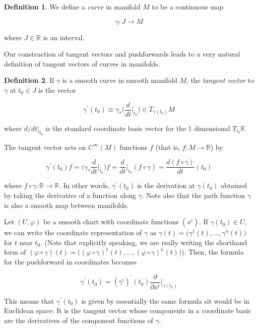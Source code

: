 \documentclass{article}
\theoremstyle{remark}
\theoremstyle{definition}
\newtheorem{definition}{Definition}[section]
\begin{document}
    \begin{definition}
      We define a \textit{curve} in manifold $M$ to be a continuous map 

        \[\gamma: J \longrightarrow M\]

      where $J \in \mathbb{R}$ is an interval. 
    \end{definition}

    Our construction of tangent vectors and pushforwards leads to a very natural definition of tangent vectors of curves in manifolds. 

    \begin{definition}
      If $\gamma$ is a smooth curve in smooth manifold $M$, the \textit{tangent vector} to $\gamma$ at $t_0 \in J$ is the vector 

        \[\gamma^\prime (t_0) \equiv \gamma_* \bigg( \frac{d}{dt} \bigg|_{t_0} \bigg) \in T_{\gamma(t_0)} M\]

      where $d/dt \big|_{t_0}$ is the standard coordinate basis vector for the 1 dimensional $T_{t_0} \mathbb{R}$. 
    \end{definition}

    The tangent vector acts on $C^\infty(M)$ functions $f$ (that is, $f: M \longrightarrow \mathbb{R}$) by

      \[\gamma^\prime (t_0) f = \bigg( \gamma_* \frac{d}{dt} \bigg|_{t_0} \bigg) f = \frac{d}{dt} \bigg|_{t_0} (f \circ \gamma) = \frac{d (f \circ \gamma)}{dt} (t_0)\]
    
    where $f \circ \gamma: \mathbb{R} \longrightarrow \mathbb{R}$. In other words, $\gamma^\prime (t_0)$ is the derivation at $\gamma(t_0)$ obtained by taking the derivative of a function along $\gamma$. Note also that the path function $\gamma$ is also a smooth map between manifolds. 

    Let $(U, \varphi)$ be a smooth chart with coordinate functions $(x^i)$. If $\gamma(t_0) \in U$, we can write the coordinate representation of $\gamma$ as $\gamma(t) = \big( \gamma^1 (t), ..., \gamma^n (t)\big)$ for $t$ near $t_0$. (Note that explicitly speaking, we are really writing the shorthand form of $(\varphi \circ \gamma) (t) = \big( (\varphi \circ \gamma)^1 (t), ..., (\varphi \circ \gamma)^n (t)\big)$). Then, the formula  for the pushforward in coordinates becomes 

      \[\gamma^\prime (t_0) = (\gamma^i)^\prime (t_0) \frac{\partial}{\partial x^i} \bigg|_{\gamma(t_0)}\]

    This means that $\gamma^\prime (t_0)$ is given by essentially the same formula sit would be in Euclidean space: It is the tangent vector whose components in a coordinate basis are the derivatives of the component functions of $\gamma$. 
\end{document}
